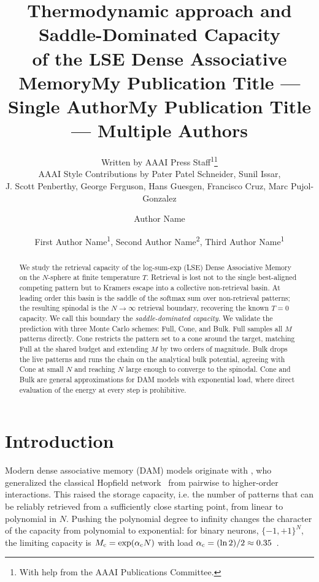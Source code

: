 \documentclass[letterpaper]{article} %
\title{\bfseries Thermodynamic approach and Saddle-Dominated Capacity
\\of the LSE Dense Associative Memory}
\author{
    Written by AAAI Press Staff\textsuperscript{\rm 1}\thanks{With help from the AAAI Publications Committee.}\\
    AAAI Style Contributions by Pater Patel Schneider,
    Sunil Issar,\\
    J. Scott Penberthy,
    George Ferguson,
    Hans Guesgen,
    Francisco Cruz\equalcontrib,
    Marc Pujol-Gonzalez\equalcontrib
}
\title{My Publication Title --- Single Author}
\author {
    Author Name
}
\title{My Publication Title --- Multiple Authors}
\author {
    First Author Name\textsuperscript{\rm 1},
    Second Author Name\textsuperscript{\rm 2},
    Third Author Name\textsuperscript{\rm 1}
}
\begin{document}
\maketitle

\begin{abstract}
We study the retrieval capacity of the log-sum-exp (LSE) Dense Associative Memory on the $N$-sphere at finite temperature $T$. Retrieval is lost not to the single best-aligned competing pattern but to Kramers escape into a collective non-retrieval basin. At leading order this basin is the saddle of the softmax sum over non-retrieval patterns; the resulting spinodal is the $N \to \infty$ retrieval boundary, recovering the known $T = 0$ capacity. We call this boundary the \textit{saddle-dominated capacity}. We validate the prediction with three Monte Carlo schemes: Full, Cone, and Bulk. Full samples all $M$ patterns directly. Cone restricts the pattern set to a cone around the target, matching Full at the shared budget and extending $M$ by two orders of magnitude. Bulk drops the live patterns and runs the chain on the analytical bulk potential, agreeing with Cone at small $N$ and reaching $N$ large enough to converge to the spinodal. Cone and Bulk are general approximations for DAM models with exponential load, where direct evaluation of the energy at every step is prohibitive.
\end{abstract}






\section{Introduction}

Modern dense associative memory (DAM) models originate with \citet{krotov2016dense}, who generalized the classical Hopfield network~\citep{Hopfield1982} from pairwise to higher-order interactions. This raised the storage capacity, i.e. the number of patterns that can be reliably retrieved from a sufficiently close starting point, from linear to polynomial in $N$. Pushing the polynomial degree to infinity changes the character of the capacity from polynomial to exponential: for binary neurons, $\{-1,+1\}^{N}$, the limiting capacity is $M_{\rm c} = \exp(\alpha_{\rm c} N)$ with load $\alpha_{\rm c} = (\ln 2)/2 \approx 0.35$~\citep{demircigil2017model}.
\end{document}
